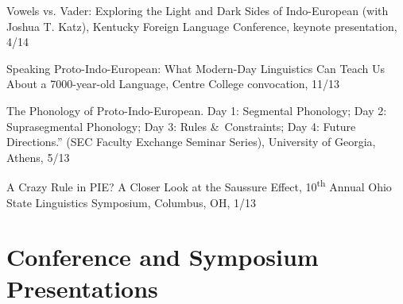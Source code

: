 \documentclass[paper=letter,fontsize=11pt]{scrartcl}
\newcommand{\TalkEntry}[4]{
		\noindent #1, #2, #3 #4}
\begin{document}
\begin{etaremune}
\item\TalkEntry{Vowels vs. Vader: Exploring the Light and Dark Sides of Indo-European (with Joshua T. Katz)}{Kentucky Foreign Language Conference, keynote presentation}{4/14}
\item\TalkEntry{Speaking Proto-Indo-European: What Modern-Day Linguistics Can Teach Us About a 7000-year-old Language}{Centre College convocation}{11/13}
\item\TalkEntry{The Phonology of Proto-Indo-European. Day 1: Segmental Phonology; Day 2: Suprasegmental Phonology; Day 3: Rules \&~Constraints; Day 4: Future Directions.” (SEC Faculty Exchange Seminar Series)}{University of Georgia, Athens}{5/13}
\item\TalkEntry{A Crazy Rule in PIE? A Closer Look at the Saussure Effect}{10\textsuperscript{th} Annual Ohio State Linguistics Symposium, Columbus, OH}{1/13}
\end{etaremune}

\section*{Conference and Symposium Presentations}
\end{document}
